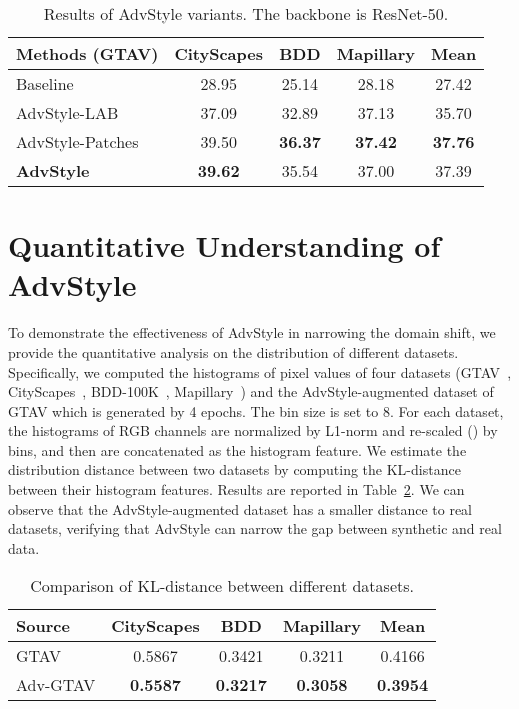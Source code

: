 \documentclass{article}
\newcommand{\ours}{AdvStyle\xspace}
\begin{document}
\begin{table}[t]
\centering
\footnotesize
\caption{Results of \ours variants. The backbone is ResNet-50.}
\setlength{\tabcolsep}{3pt}
\begin{tabular}{l|c|c|c|c}
\toprule
Methods (GTAV) & \multicolumn{1}{c|}{CityScapes} & \multicolumn{1}{c|}{BDD} & \multicolumn{1}{c|}{Mapillary} & \multicolumn{1}{c}{Mean}\\
\midrule
{\cellcolor[gray]{1}}Baseline~\cite{robustnet} & 28.95  & 25.14 & 28.18  & 27.42\\
{\cellcolor[gray]{1}}{AdvStyle-LAB} & 37.09 &  32.89 & 37.13 & 35.70 \\
{\cellcolor[gray]{1}}{AdvStyle-Patches} & 39.50 & \bf 36.37 & \bf 37.42 & \bf 37.76 \\
\midrule
{\cellcolor[gray]{1}}\textbf{AdvStyle} &\bf 39.62 & 35.54 & 37.00 & 37.39 \\
\bottomrule
\end{tabular}
\label{table:variants}
\end{table}


\section{Quantitative Understanding of \ours} 

To demonstrate the effectiveness of \ours in narrowing the domain shift, we provide the quantitative analysis on the distribution of different datasets. Specifically, we computed the histograms of pixel values of four datasets (GTAV~\cite{gtav}, CityScapes~\cite{CityScapes}, BDD-100K~\cite{bdd}, Mapillary~\cite{mapillary}) and the AdvStyle-augmented dataset of GTAV which is generated by 4 epochs. The bin size is set to 8. For each dataset, the histograms of RGB channels are normalized by L1-norm and re-scaled () by bins, and then are concatenated as the histogram feature. We estimate the distribution distance between two datasets by computing the KL-distance between their histogram features. Results are reported in Table~\ref{table:kl}.
We can observe that the AdvStyle-augmented dataset has a smaller distance to real datasets, verifying that \ours can narrow the gap between synthetic and real data. 
\begin{table}[!ht]
\centering
\footnotesize
\caption{Comparison of KL-distance between different datasets.}
\setlength{\tabcolsep}{3pt}
\begin{tabular}{l|c|c|c|c}
\toprule
Source & CityScapes  & BDD  & Mapillary  & Mean  \\
\midrule
GTAV & 0.5867 & 0.3421 & 0.3211 & 0.4166 \\
Adv-GTAV & \bf 0.5587 & \bf 0.3217 & \bf 0.3058 & \bf 0.3954  \\
\bottomrule
\end{tabular}
\label{table:kl}
\end{table}
\end{document}
